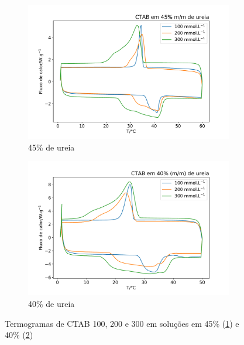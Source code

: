 		\begin{figure}[H]
			\begin{subfigure}[t]{0.45\textwidth}
				\centering
				\includegraphics[width=\textwidth]{./imagens/dsc/CTAB_45p}
				\caption{45\% de ureia}
				\label{fig:DSC_CTAB_UR45}
			\end{subfigure} \qquad %
			\begin{subfigure}[t]{0.45\textwidth}
				\centering
				\includegraphics[width=\textwidth]{./imagens/dsc/CTAB_40p}
				\caption{40\% de ureia}
				\label{fig:DSC_CTAB_UR40}
			\end{subfigure}
			\caption{Termogramas de CTAB 100, 200 e 300 \mM{} em soluções em 45\% (\ref{fig:DSC_CTAB_UR45}) e 40\% (\ref{fig:DSC_CTAB_UR40})}
			\label{fig:DSC_CTAB_UR40-45}
		\end{figure}
	
